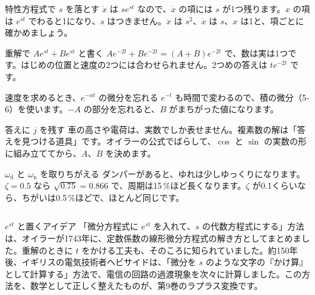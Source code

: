 
\begin{tsumazuki}{特性方程式で $s$ を落とす}
$\dot x$ は $se^{st}$ なので、$\dot x$ の項には $s$ が1つ残ります。$x$ の項は $e^{st}$ でわると1になり、$s$ はつきません。$\ddot x$ は $s^2$、$\dot x$ は $s$、$x$ は1と、項ごとに確かめましょう。
\end{tsumazuki}

\begin{tsumazuki}{重解で $Ae^{st}+Be^{st}$ と書く}
$Ae^{-2t}+Be^{-2t}=(A+B)e^{-2t}$ で、数は実は1つです。はじめの位置と速度の2つには合わせられません。2つめの答えは $te^{-2t}$ です。
\end{tsumazuki}

\begin{tsumazuki}{速度を求めるとき、$e^{-\alpha t}$ の微分を忘れる}
$e^{-t}$ も時間で変わるので、積の微分（5-6）を使います。$-A$ の部分を忘れると、$B$ がまちがった値になります。
\end{tsumazuki}

\begin{tsumazuki}{答えに $j$ を残す}
車の高さや電荷は、実数でしか表せません。複素数の解は「答えを見つける道具」です。オイラーの公式でばらして、$\cos$ と $\sin$ の実数の形に組み立ててから、$A$、$B$ を決めます。
\end{tsumazuki}

\begin{tsumazuki}{$\omega_{\mathrm d}$ と $\omega_{\mathrm n}$ を取りちがえる}
ダンパーがあると、ゆれは少しゆっくりになります。$\zeta=0.5$ なら $\sqrt{0.75}=0.866$ で、周期は15\,\%ほど長くなります。$\zeta$ が0.1くらいなら、ちがいは0.5\,\%ほどで、ほとんど同じです。
\end{tsumazuki}

\begin{column}{$e^{st}$ と置くアイデア}
「微分方程式に $e^{st}$ を入れて、$s$ の代数方程式にする」方法は、オイラーが1743年に、定数係数の線形微分方程式の解き方としてまとめました。重解のときに $t$ をかける工夫も、そのころに知られていました。約150年後、イギリスの電気技術者ヘビサイドは、「微分を $s$ のような文字の『かけ算』として計算する」方法で、電信の回路の過渡現象を次々に計算しました。この方法を、数学として正しく整えたものが、第9巻のラプラス変換です。
\end{column}

